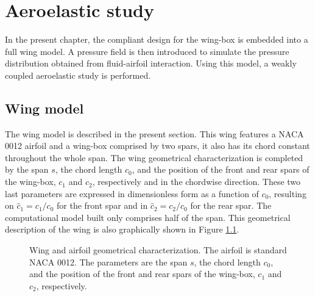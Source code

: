 \chapter{Aeroelastic study} \label{chap:aeroelastic}

  In the present chapter, the compliant design for the wing-box is embedded into a full wing model. A pressure field is then introduced to simulate the pressure distribution obtained from fluid-airfoil interaction. Using this model, a weakly coupled aeroelastic study is performed. 

  \section{Wing model} \label{sec:wingModel_aeroelastic}

    The wing model is described in the present section. This wing features a NACA 0012 airfoil and a wing-box comprised by two spars, it also has its chord constant throughout the whole span. The wing geometrical characterization is completed by the span $s$, the chord length $c_0$, and the position of the front and rear spars of the wing-box, $c_1$ and $c_2$, respectively and in the chordwise direction. These two last parameters are expressed in dimensionless form as a function of $c_0$, resulting on $\hat{c}_1 = c_1 /c_0$ for the front spar and in $\hat{c}_2 = c_2 /c_0$ for the rear spar. The computational model built only comprises half of the span. This geometrical description of the wing is also graphically shown in Figure \ref{fig:wing-dim}. 

    \begin{figure}[!htpb]
      \centering
       \qquad
      \caption[Wing geometrical characterization]{Wing and airfoil geometrical characterization. The airfoil is standard NACA 0012. The parameters are the span $s$, the chord length $c_0$, and the position of the front and rear spars of the wing-box, $c_1$ and $c_2$, respectively.}
      \label{fig:wing-dim}
    \end{figure}

